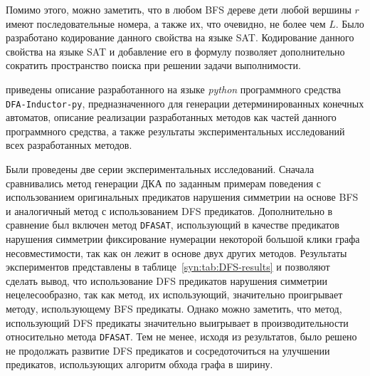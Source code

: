 Помимо этого, можно заметить, что в любом BFS дереве дети любой вершины $r$ имеют последовательные номера, а также их, что очевидно, не более чем $L$.
Было разработано кодирование данного свойства на языке SAT.
Кодирование данного свойства на языке SAT и добавление его в формулу позволяет дополнительно сократить пространство поиска при решении задачи выполнимости.


\insection{\ref{sec:space:results}} приведены описание разработанного  на языке \emph{python} программного средства \texttt{DFA-Inductor-py}, предназначенного для генерации детерминированных конечных автоматов, описание реализации разработанных методов как частей данного программного средства, а также результаты экспериментальных исследований всех разработанных методов. 


Были проведены две серии экспериментальных исследований.
Сначала сравнивались метод генерации ДКА по заданным примерам поведения с использованием оригинальных предикатов нарушения симметрии на основе BFS и аналогичный метод с использованием DFS предикатов.
Дополнительно в сравнение был включен метод \texttt{DFASAT}, использующий в качестве предикатов нарушения симметрии фиксирование нумерации некоторой большой клики графа несовместимости, так как он лежит в основе двух других методов. 
Результаты экспериментов представлены в таблице~\ref{syn:tab:DFS-results} и позволяют сделать вывод, что использование DFS предикатов нарушения симметрии нецелесообразно, так как метод, их использующий, значительно проигрывает методу, использующему BFS предикаты.
Однако можно заметить, что метод, использующий DFS предикаты значительно выигрывает в производительности относительно метода \texttt{DFASAT}.
Тем не менее, исходя из результатов, было решено не продолжать развитие DFS предикатов и сосредоточиться на улучшении предикатов, использующих алгоритм обхода графа в ширину.

